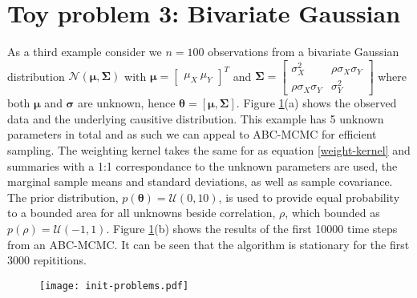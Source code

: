\section{Toy problem 3: Bivariate Gaussian}
As a third example consider we $n = 100$ observations from a bivariate Gaussian distribution $\mathcal{N}(\bm{\mu},\bm{\Sigma})$ with $\bm{\mu} = \begin{bmatrix}
\mu_X\ \mu_Y
\end{bmatrix}^T$ and $\bm{\Sigma} = \begin{bmatrix}
\sigma^2_X & \rho\sigma_X\sigma_Y\\
\rho\sigma_X\sigma_Y & \sigma^2_Y
\end{bmatrix} $ where both $\bm{\mu}$ and $\bm{\sigma}$ are unknown, hence $\bm{\theta} = [\bm{\mu},\bm{\Sigma}]$. Figure \ref{init-qualms}(a) shows the observed data and the underlying causitive distribution. This example has 5 unknown parameters in total and as such we can appeal to ABC-MCMC for efficient sampling. The weighting kernel takes the same for as equation \ref{weight-kernel} and summaries with a 1:1 correspondance to the unknown parameters are used, the marginal sample means and standard deviations, as well as sample covariance. The prior distribution, $p(\bm{\theta}) = \mathcal{U}(0,10)$, is used to provide equal probability to a bounded area for all unknowns beside correlation, $\rho$, which bounded as $p(\rho) = \mathcal{U}(-1,1)$. Figure \ref{init-qualms}(b) shows the results of the first 10000 time steps from an ABC-MCMC. It can be seen that the algorithm is stationary for the first 3000 repititions.\\

\begin{figure}[H]
	\centering
	\texttt{[image: init-problems.pdf]}
	\caption{}
	\label{init-qualms}
\end{figure}


